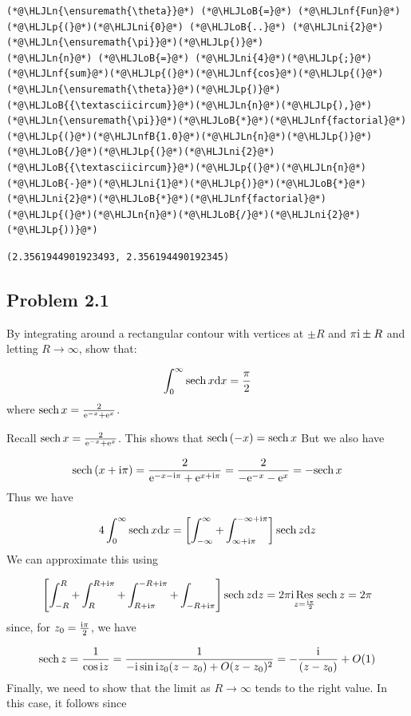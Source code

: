 \documentclass[12pt,a4paper]{article}
\newcommand{\HLJLn}[1]{#1}
\newcommand{\HLJLnf}[1]{\textcolor[RGB]{66,102,213}{#1}}
\newcommand{\HLJLnfB}[1]{\textcolor[RGB]{59,151,46}{#1}}
\newcommand{\HLJLni}[1]{\textcolor[RGB]{59,151,46}{#1}}
\newcommand{\HLJLoB}[1]{\textcolor[RGB]{102,102,102}{\textbf{#1}}}
\newcommand{\HLJLp}[1]{#1}
\def\D{ {\rm d} }
\def\I{ {\rm i} }
\def\E{ {\rm e} }
\def\Res_#1{\underset{#1}{\rm Res}\,}
\def\sech{ {\rm sech}\, }
\def\dx{\D x}
\def\dz{\D z}
\begin{document}
\begin{lstlisting}
(*@\HLJLn{\ensuremath{\theta}}@*) (*@\HLJLoB{=}@*) (*@\HLJLnf{Fun}@*)(*@\HLJLp{(}@*)(*@\HLJLni{0}@*) (*@\HLJLoB{..}@*) (*@\HLJLni{2}@*)(*@\HLJLn{\ensuremath{\pi}}@*)(*@\HLJLp{)}@*)
(*@\HLJLn{n}@*) (*@\HLJLoB{=}@*) (*@\HLJLni{4}@*)(*@\HLJLp{;}@*)
(*@\HLJLnf{sum}@*)(*@\HLJLp{(}@*)(*@\HLJLnf{cos}@*)(*@\HLJLp{(}@*)(*@\HLJLn{\ensuremath{\theta}}@*)(*@\HLJLp{)}@*)(*@\HLJLoB{{\textasciicircum}}@*)(*@\HLJLn{n}@*)(*@\HLJLp{),}@*) (*@\HLJLn{\ensuremath{\pi}}@*)(*@\HLJLoB{*}@*)(*@\HLJLnf{factorial}@*)(*@\HLJLp{(}@*)(*@\HLJLnfB{1.0}@*)(*@\HLJLn{n}@*)(*@\HLJLp{)}@*)(*@\HLJLoB{/}@*)(*@\HLJLp{(}@*)(*@\HLJLni{2}@*)(*@\HLJLoB{{\textasciicircum}}@*)(*@\HLJLp{(}@*)(*@\HLJLn{n}@*)(*@\HLJLoB{-}@*)(*@\HLJLni{1}@*)(*@\HLJLp{)}@*)(*@\HLJLoB{*}@*)(*@\HLJLni{2}@*)(*@\HLJLoB{*}@*)(*@\HLJLnf{factorial}@*)(*@\HLJLp{(}@*)(*@\HLJLn{n}@*)(*@\HLJLoB{/}@*)(*@\HLJLni{2}@*)(*@\HLJLp{))}@*)
\end{lstlisting}

\begin{lstlisting}
(2.3561944901923493, 2.356194490192345)
\end{lstlisting}


\subsection{Problem 2.1}
By integrating around a rectangular contour with vertices at $\pm R$ and $\pi \I \pm R$ and letting $R \rightarrow \infty$, show that:

\[
\int_0^\infty \sech x \dx = {\pi \over 2}
\]
where $\sech x = {2 \over \E^{-x} + \E^x}$.

Recall $\sech x = {2 \over \E^{-x} + \E^x} $. This shows that $\sech(-x) = \sech x$ But we also have 

\[
\sech(x + \I \pi) =  {2 \over \E^{-x-\I \pi} + \E^{x+ \I \pi}} =  {2 \over -\E^{-x} - \E^{x}} = -\sech x
\]
Thus we have

\[
    4\int_0^\infty \sech x \dx = \left[ \int_{-\infty}^\infty + \int_{\infty+\I\pi}^{-\infty + \I \pi} \right] \sech z \dz
\]
We can approximate this using

\[
\left[ \int_{-R}^R + \int_R^{R+\I \pi} + \int_{R+\I \pi}^{-R+\I\pi} + \int_{-R+\I \pi} \right ] \sech z \dz = 2 \pi \I \Res_{z = {\I \pi \over 2}} \sech z  = 2 \pi 
\]
since, for $z_0 = {\I \pi \over 2}$, we have

\[
\sech z = {1 \over \cos \I z} = {1 \over - \I \sin \I z_0 (z- z_0) + O(z-z_0)^2}  
= -{\I \over (z- z_0)} + O(1)
\]
Finally, we need to show that the limit as $R \rightarrow \infty$ tends to the right value. In this case, it follows since 
\end{document}
